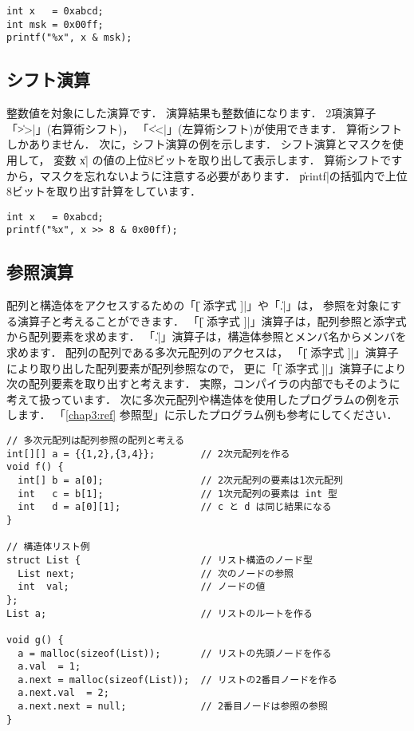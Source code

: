 \begin{mylist}
\begin{verbatim}
int x   = 0xabcd;
int msk = 0x00ff;
printf("%x", x & msk);
\end{verbatim}
\end{mylist}

\subsection{シフト演算}

整数値を対象にした演算です．
演算結果も整数値になります．
2項演算子
「\|>>|」(右算術シフト)，
「\|<<|」(左算術シフト)が使用できます．
算術シフトしかありません．
次に，シフト演算の例を示します．
シフト演算とマスクを使用して，
変数 \|x| の値の上位8ビットを取り出して表示します．
算術シフトですから，マスクを忘れないように注意する必要があります．
\|printf|の括弧内で上位8ビットを取り出す計算をしています．

\begin{mylist}
\begin{verbatim}
int x   = 0xabcd;
printf("%x", x >> 8 & 0x00ff);
\end{verbatim}
\end{mylist}

\subsection{参照演算}

配列と構造体をアクセスするための「\|[ 添字式 ]|」や「\|.|」は，
参照を対象にする演算子と考えることができます．
「\|[ 添字式 ]|」演算子は，配列参照と添字式から配列要素を求めます．
「\|.|」演算子は，構造体参照とメンバ名からメンバを求めます．
配列の配列である多次元配列のアクセスは，
「\|[ 添字式 ]|」演算子により取り出した配列要素が配列参照なので，
更に「\|[ 添字式 ]|」演算子により次の配列要素を取り出すと考えます．
実際，\cmm コンパイラの内部でもそのように考えて扱っています．
次に多次元配列や構造体を使用したプログラムの例を示します．
「\ref{chap3:ref} 参照型」に示したプログラム例も参考にしてください．

\begin{mylist}
\begin{verbatim}
// 多次元配列は配列参照の配列と考える
int[][] a = {{1,2},{3,4}};        // 2次元配列を作る
void f() {
  int[] b = a[0];                 // 2次元配列の要素は1次元配列
  int   c = b[1];                 // 1次元配列の要素は int 型
  int   d = a[0][1];              // c と d は同じ結果になる
}

// 構造体リスト例
struct List {                     // リスト構造のノード型
  List next;                      // 次のノードの参照
  int  val;                       // ノードの値
};
List a;                           // リストのルートを作る

void g() {
  a = malloc(sizeof(List));       // リストの先頭ノードを作る
  a.val  = 1;
  a.next = malloc(sizeof(List));  // リストの2番目ノードを作る
  a.next.val  = 2;
  a.next.next = null;             // 2番目ノードは参照の参照
}
\end{verbatim}
\end{mylist}

